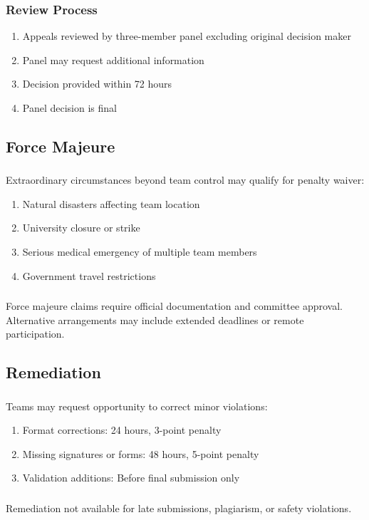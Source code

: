 \subsubsection{Review Process}
\begin{enumerate}[noitemsep]
    \item Appeals reviewed by three-member panel excluding original decision maker
    \item Panel may request additional information
    \item Decision provided within 72 hours
    \item Panel decision is final
\end{enumerate}

\subsection{Force Majeure}

\subsubsection{}
Extraordinary circumstances beyond team control may qualify for penalty waiver:
\begin{enumerate}[noitemsep]
    \item Natural disasters affecting team location
    \item University closure or strike
    \item Serious medical emergency of multiple team members
    \item Government travel restrictions
\end{enumerate}

\subsubsection{}
Force majeure claims require official documentation and committee approval. Alternative arrangements may include extended deadlines or remote participation.

\subsection{Remediation}

\subsubsection{}
Teams may request opportunity to correct minor violations:
\begin{enumerate}[noitemsep]
    \item Format corrections: 24 hours, 3-point penalty
    \item Missing signatures or forms: 48 hours, 5-point penalty
    \item Validation additions: Before final submission only
\end{enumerate}

\subsubsection{}
Remediation not available for late submissions, plagiarism, or safety violations.